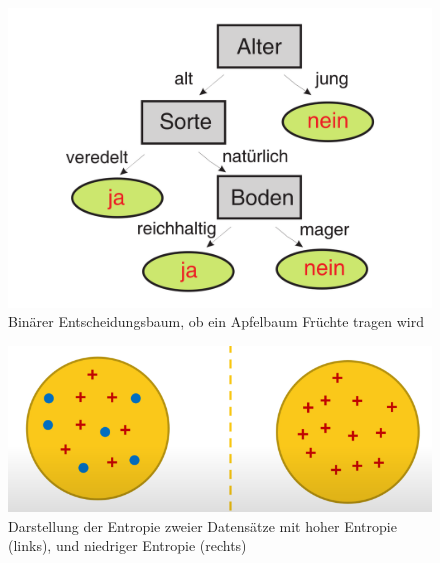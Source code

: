 \begin{figure}[H]
    \begin{center}
        \includegraphics[width=\linewidth]{images/entscheidungsbaum.png}
        \caption[Binärer Entscheidungsbaum]{Binärer Entscheidungsbaum, ob ein Apfelbaum Früchte tragen wird \cite{entscheidungsbaum}}
        \label{fi:entscheidungsbaum}
    \end{center}
\end{figure}
\begin{figure}[H]
    \begin{center}
        \includegraphics[width=\linewidth]{images/entropie.png}
        \caption[Darstellung Entropie]{Darstellung der Entropie zweier Datensätze mit hoher Entropie (links), und niedriger Entropie (rechts) \cite{entropie}}
        \label{fi:entropie}
    \end{center}
\end{figure}